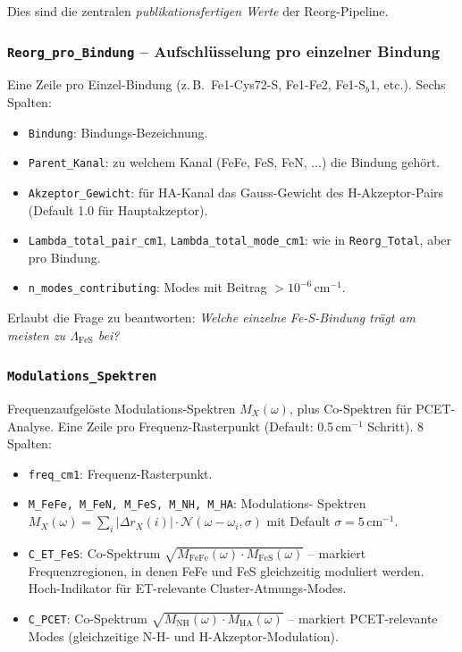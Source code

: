 \documentclass[11pt,a4paper,twoside]{article}
\theoremstyle{remark}
\begin{document}
Dies sind die zentralen \emph{publikationsfertigen Werte} der
Reorg-Pipeline.

\subsubsection*{\texttt{Reorg\_pro\_Bindung} -- Aufschl\"usselung
                  pro einzelner Bindung}

Eine Zeile pro Einzel-Bindung (z.\,B.\ Fe1-Cys72-S, Fe1-Fe2,
Fe1-S$_b$1, etc.). Sechs Spalten:

\begin{itemize}\setlength{\itemsep}{0pt}
  \item \texttt{Bindung}: Bindungs-Bezeichnung.
  \item \texttt{Parent\_Kanal}: zu welchem Kanal (FeFe, FeS, FeN, ...)
        die Bindung geh\"ort.
  \item \texttt{Akzeptor\_Gewicht}: f\"ur HA-Kanal das Gauss-Gewicht
        des H-Akzeptor-Pairs (Default 1.0 f\"ur Hauptakzeptor).
  \item \texttt{Lambda\_total\_pair\_cm1}, \texttt{Lambda\_total\_mode\_cm1}:
        wie in \texttt{Reorg\_Total}, aber pro Bindung.
  \item \texttt{n\_modes\_contributing}: Modes mit Beitrag $> 10^{-6}$\,cm$^{-1}$.
\end{itemize}

Erlaubt die Frage zu beantworten: \emph{Welche einzelne Fe-S-Bindung
tr\"agt am meisten zu $\Lambda_\text{FeS}$ bei?}

\subsubsection*{\texttt{Modulations\_Spektren}}

Frequenzaufgel\"oste Modulations-Spektren $M_X(\omega)$, plus
Co-Spektren f\"ur PCET-Analyse. Eine Zeile pro Frequenz-Rasterpunkt
(Default: 0.5\,cm$^{-1}$ Schritt). 8 Spalten:

\begin{itemize}\setlength{\itemsep}{0pt}
  \item \texttt{freq\_cm1}: Frequenz-Rasterpunkt.
  \item \texttt{M\_FeFe, M\_FeN, M\_FeS, M\_NH, M\_HA}: Modulations-
        Spektren $M_X(\omega) = \sum_i |\Delta r_X(i)| \cdot
        \mathcal{N}(\omega - \omega_i, \sigma)$ mit Default
        $\sigma=5$\,cm$^{-1}$.
  \item \texttt{C\_ET\_FeS}: Co-Spektrum
        $\sqrt{M_\text{FeFe}(\omega) \cdot M_\text{FeS}(\omega)}$
        -- markiert Frequenzregionen, in denen FeFe und FeS
        gleichzeitig moduliert werden. Hoch-Indikator f\"ur
        ET-relevante Cluster-Atmungs-Modes.
  \item \texttt{C\_PCET}: Co-Spektrum
        $\sqrt{M_\text{NH}(\omega) \cdot M_\text{HA}(\omega)}$
        -- markiert PCET-relevante Modes (gleichzeitige
        N-H- und H-Akzeptor-Modulation).
\end{itemize}
\end{document}
